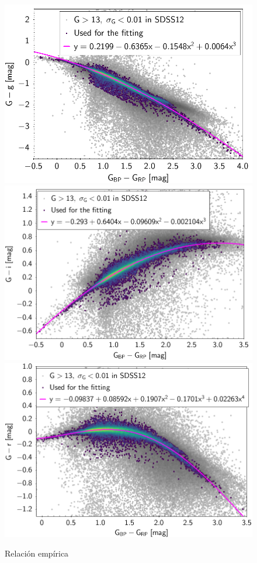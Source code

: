 \begin{figure}[!h]
	\centering
	\includegraphics[scale=0.27]{Muestra/Secciones/Figures/Gaia-SDSS-Transform-g.png}
	\includegraphics[scale=0.27]{Muestra/Secciones/Figures/Gaia-SDSS-Transform-i.png}
	\includegraphics[scale=0.27]{Muestra/Secciones/Figures/Gaia-SDSS-Transform-r.png}

	\caption{Relación empírica }
	\label{gdr3SdssConversionGraphs}
\end{figure}